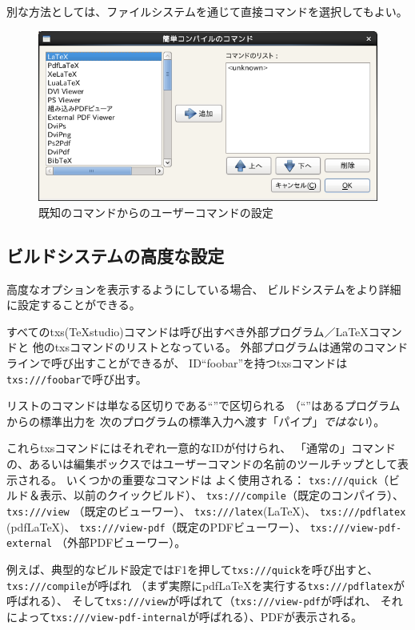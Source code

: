 別な方法としては、ファイルシステムを通じて直接コマンドを選択してもよい。

\begin{figure}[H]
  \centering
  \includegraphics[width=.8\linewidth]{doc21.png}
  \caption{既知のコマンドからのユーザーコマンドの設定}
\end{figure}

\subsection{ビルドシステムの高度な設定}\label{subsec:advancemode}

高度なオプションを表示するようにしている場合、
ビルドシステムをより詳細に設定することができる。

すべてのtxs(TeXstudio)コマンドは呼び出すべき外部プログラム／LaTeXコマンドと
他のtxsコマンドのリストとなっている。
外部プログラムは通常のコマンドラインで呼び出すことができるが、
ID``foobar''を持つtxsコマンドは\texttt{txs:///foobar}で呼び出す。

リストのコマンドは単なる区切りである``\textbar{}''で区切られる
（``\textbar{}''はあるプログラムからの標準出力を
次のプログラムの標準入力へ渡す「パイプ」\emph{ではない}）。

これらtxsコマンドにはそれぞれ一意的なIDが付けられ、
「通常の」コマンドの、あるいは編集ボックスではユーザーコマンドの名前のツールチップとして表示される。
いくつかの重要なコマンドは
よく使用される： \texttt{txs:///quick}（ビルド＆表示、以前のクイックビルド）、
 \texttt{txs:///compile}（既定のコンパイラ）、
 \texttt{txs:///view} （既定のビューワー）、 \texttt{txs:///latex}(LaTeX)、
 \texttt{txs:///pdflatex} (pdfLaTeX)、 \texttt{txs:///view-pdf}（既定のPDFビューワー）、
 \texttt{txs:///view-pdf-external} （外部PDFビューワー）。

例えば、典型的なビルド設定ではF1を押して\texttt{txs:///quick}を呼び出すと、
\texttt{txs:///compile}が呼ばれ
（まず実際にpdfLaTeXを実行する\texttt{txs:///pdflatex}が呼ばれる）、
そして\texttt{txs:///view}が呼ばれて（\texttt{txs:///view-pdf}が呼ばれ、
それによって\texttt{txs:///view-pdf-internal}が呼ばれる）、PDFが表示される。

